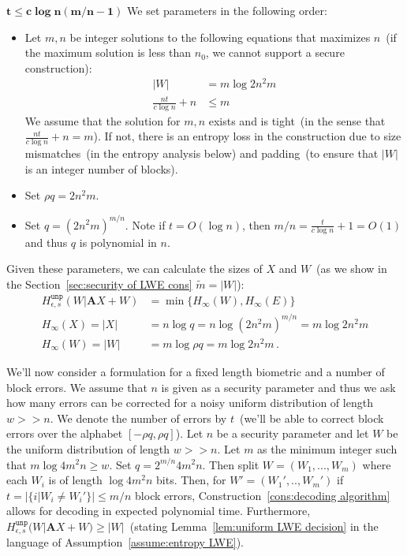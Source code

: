 \documentclass[11pt]{article}
\newcommand{\secref}[1]{\mbox{Section~\ref{#1}}}
\newcommand{\lemref}[1]{\mbox{Lemma~\ref{#1}}}
\newcommand{\vect}[1]{\ensuremath{\textbf{#1}}}
\newcommand{\unp}{\ensuremath{\mathtt{unp}}\xspace}
\newcommand{\vA}{\vect{A}}
\begin{document}
{$\mathbf{t \leq c\log n(m/n-1)}$
We set parameters in the following order:
\begin{itemize}
\item Let $m, n$ be integer solutions to the following equations that maximizes $n$~(if the maximum solution is less than $n_0$, we cannot support a secure construction):
\begin{align*}
|W| & = m\log 2n^2m\\
 \frac{nt}{c\log n} + n&\leq m
\end{align*}
We assume that the solution for $m,n$ exists and is tight~(in the sense that $ \frac{nt}{c\log n} + n=m$).  If not, there is an entropy loss in the construction due to size mismatches~(in the entropy analysis below) and padding~(to ensure that $|W|$ is an integer number of blocks).
\item Set $\rho q = 2n^2m $.
\item Set $q = (2n^2m)^{m/n}$.  Note if $t = O(\log n)$, then $m/n = \frac{t}{c\log n} +1 = O(1)$ and thus $q$ is polynomial in $n$.
\end{itemize}  Given these parameters, we can calculate the sizes of $X$ and $W$~(as we show in the \secref{sec:security of LWE cons} $\tilde{m} =|W|$):
\begin{align*}
H^{\unp}_{\epsilon, s} ( W | \vA X+W) &= \min\{ H_\infty(W), H_\infty(E)\}\\
H_\infty(X) = |X| &= n \log q= n \log (2n^2m)^{m/n} = m \log 2n^2m\\
H_\infty(W) = |W| & = m \log \rho q = m \log 2n^2 m\,.
\end{align*}

We'll now consider a formulation for a fixed length biometric and a number of block errors.  We assume that $n$ is given as a security parameter and thus we ask how many errors can be corrected for a noisy uniform distribution of length $w>>n$.  We denote the number of errors by $t$~(we'll be able to correct block errors over the alphabet $[-\rho q, \rho q]$).  
Let $n$ be a security parameter and let $W$ be the uniform distribution of length $w>>n$.  Let $m$ as the minimum integer such that $m\log 4m^2 n\geq w$.  Set $q = 2^{m/n}4m^2n$.  Then split $W=( W_1,..., W_m)$ where each $W_i$ is of length $\log 4m^2 n$ bits.  Then, for $W' =( W_1',.., W_m')$ if  $t = |\{i |  W_i \neq W_i'\}| \leq m/n$ block errors, Construction~\ref{cons:decoding algorithm} allows for decoding in expected polynomial time.  Furthermore, $H^{\unp}_{\epsilon, s}(W | \vA X+W)\geq |W|$~(stating \lemref{lem:uniform LWE decision} in the language of Assumption~\ref{assume:entropy LWE}).  

}
\end{document}
